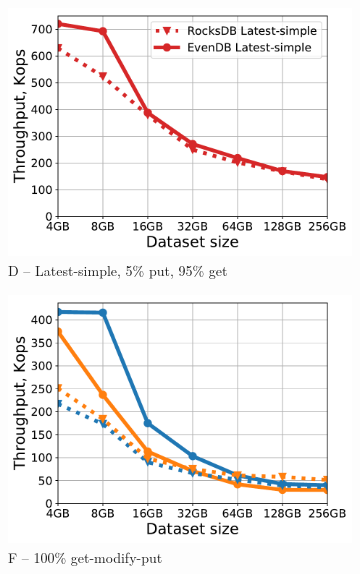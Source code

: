 \begin{figure}[tb]
\begin{subfigure}{0.32\linewidth}
\includegraphics[width=\textwidth]{figs/Workload_D_line.pdf}
\caption{D -- Latest-simple, 5\% put, 95\% get}
\label{fig:throughput:d}
\end{subfigure}
\begin{subfigure}{0.32\linewidth}
\includegraphics[width=\textwidth]{figs/Workload_F_line.pdf}
\caption{F -- 100\% get-modify-put}
\label{fig:throughput:f}
\end{subfigure}
\begin{subfigure}{0.32\linewidth}

\end{subfigure}
\end{figure}
